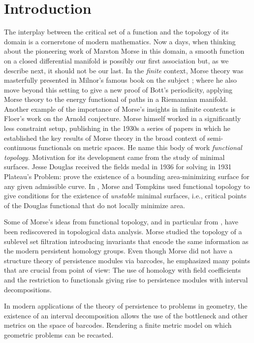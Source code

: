 
\section{Introduction}

The interplay between the critical set of a function and the topology of its domain is a cornerstone of modern mathematics.
Now a days, when thinking about the pioneering work of Marston Morse in this domain, a smooth function on a closed differential manifold is possibly our first association but, as we describe next, it should not be our last.
In the \textit{finite} context, Morse theory was masterfully presented in Milnor's famous book on the subject \cite{MR0163331}; where he also move beyond this setting to give a new proof of Bott's periodicity, applying Morse theory to the energy functional of paths in a Riemannian manifold.
Another example of the importance of Morse's insights in infinite contexts is Floer's work on the Arnold conjecture.
Morse himself worked in a significantly less constraint setup, publishing in the 1930s a series of papers \cite{Morse.1937, Morse.1938, Morse.1940, MR9102} in which he established the key results of Morse theory in the broad context of semi-continuous functionals on metric spaces.
He name this body of work \textit{functional topology}.
Motivation for its development came from the study of minimal surfaces.
Jesse Douglas received the fields medal in 1936 for solving in 1931 \cite{Douglas.1931} Plateau’s Problem: prove the existence of a bounding area-minimizing surface for any given admissible curve.
In \cite{Morse.1939, Morse.1941}, Morse and Tompkins used functional topology to give conditions for the existence of \textit{unstable} minimal surfaces, i.e., critical points of the Douglas functional that do not locally minimize area.

Some of Morse's ideas from functional topology, and in particular from \cite{Morse.1940}, have been rediscovered in topological data analysis.
Morse studied the topology of a sublevel set filtration introducing invariants that encode the same information as the modern persistent homology groups.
Even though Morse did not have a structure theory of persistence modules via barcodes, he emphasized many points that are crucial from point of view:
The use of homology with field coefficients and the restriction to functionals giving rise to persistence modules with interval decompositions.

In modern applications of the theory of persistence to problems in geometry, the existence of an interval decomposition allows the use of the bottleneck and other metrics on the space of barcodes.
Rendering a finite metric model on which geometric problems can be recasted.

